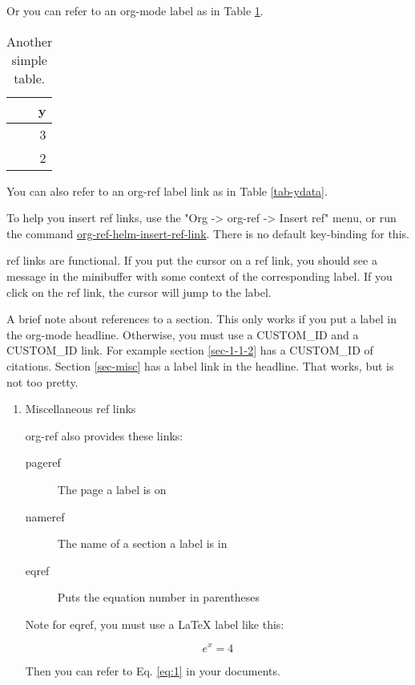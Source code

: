 \documentclass[11pt]{article}
\begin{document}
Or you can refer to an org-mode label as in Table \ref{table-3}.

\begin{table}[htb]
\caption{\label{table-3}Another simple table.}
\centering
\begin{tabular}{r}
y\\
\hline
3\\
2\\
\end{tabular}
\end{table}

You can also refer to an org-ref label link as in Table \ref{tab-ydata}.

To help you insert ref links, use the "Org -> org-ref -> Insert ref" menu, or run the command \url{org-ref-helm-insert-ref-link}. There is no default key-binding for this.

ref links are functional. If you put the cursor on a ref link, you should see a message in the minibuffer with some context of the corresponding label. If you click on the ref link, the cursor will jump to the label.

A brief note about references to a section. This only works if you put a label in the org-mode headline. Otherwise, you must use a CUSTOM\_ID and a CUSTOM\_ID link. For example section \ref{sec-1-1-2} has a CUSTOM\_ID of citations. Section \ref{sec-misc} has a label link in the headline. That works, but is not too pretty.

\begin{enumerate}
\item Miscellaneous ref links  \label{sec-misc}
\label{sec-1-1-4-1}
  

org-ref also provides these links:

\begin{description}
\item[{pageref}] The page a label is on
\item[{nameref}] The name of a section a label is in
\item[{eqref}] Puts the equation number in parentheses
\end{description}

Note for eqref, you must use a \LaTeX{} label like this:

\begin{equation}
e^x = 4 \label{eq:1}
\end{equation}

Then you can refer to Eq. \eqref{eq:1} in your documents.
\end{enumerate}
\end{document}
